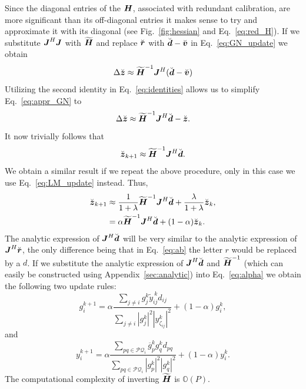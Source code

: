 \documentclass[useAMS,usenatbib]{mn2e}
\newcommand{\bz}{\bmath{z}}
\newcommand{\br}{\bmath{r}}
\newcommand{\bd}{\bmath{d}}
\newcommand{\bv}{\bmath{v}}
\newcommand{\bJ}{\bmath{J}}
\newcommand{\bH}{\bmath{H}}
\newcommand{\conj}[1]{\overline{#1}}
\begin{document}
Since the diagonal entries of the $\bH$, associated with redundant calibration, are more significant than its off-diagonal entries it makes 
sense to try and approximate it with its diagonal (see Fig.~\ref{fig:hessian} and Eq.~\eqref{eq:red_H}).
If we substitute $\bJ^H\bJ$ with $\widetilde{\bH}$ and replace $\breve{\br}$ with $\breve{\bd} - \breve{\bv}$ in Eq.~\eqref{eq:GN_update} we obtain
\begin{equation}
\label{eq:appr_GN}
 \Delta \breve{\bz} \approx \widetilde{\bH}^{-1}\bJ^H(\breve{\bd}-\breve{\bv})
\end{equation}
Utilizing the second identity in Eq.~\eqref{eq:identities} allows us to simplify Eq.~\eqref{eq:appr_GN} to
\begin{equation}
  \Delta \breve{\bz} \approx \widetilde{\bH}^{-1}\bJ^H\breve{\bd}-\breve{\bz}.
\end{equation}
It now trivially follows that
\begin{equation}
 \breve{\bz}_{k+1} \approx \widetilde{\bH}^{-1}\bJ^H\breve{\bd}.
\end{equation}
We obtain a similar result if we repeat the above procedure, only in this case we use Eq.~\eqref{eq:LM_update} instead. Thus,
\begin{align}
\breve{\bz}_{k+1} &\approx \frac{1}{1+\lambda}\widetilde{\bH}^{-1}\bJ^H\breve{\bd} + \frac{\lambda}{1+\lambda} \breve{\bz}_k,\label{eq:lambda}\\
 &= \alpha \widetilde{\bH}^{-1}\bJ^H\breve{\bd} + (1-\alpha)\breve{\bz}_k. \label{eq:alpha}  
\end{align}
The analytic expression of $\bJ^H\breve{\bd}$ will be very similar to the analytic 
expression of $\bJ^H\breve{\br}$, the only difference being that in Eq.~\eqref{eq:ab} the letter $r$ would be replaced by a $d$. If we substitute the analytic expression
of $\bJ^H\breve{\bd}$ and $\widetilde{\bH}^{-1}$ (which can easily be constructed using Appendix~\ref{sec:analytic}) into Eq.~\eqref{eq:alpha} we obtain the following two update rules:
\begin{equation}
\label{eq:g_update}
g_{i}^{k+1} = \alpha \frac{\sum_{j\neq i} g_j^k \widetilde{y}_{ij}^{~\!\!k} d_{ij}}{\sum_{j\neq i} |g_j^k|^2|y_{\zeta_{ij}}^k|^2} + (1-\alpha) g_i^k, 
\end{equation}
and
\begin{equation}
\label{eq:y_update}
y_{i}^{k+1} = \alpha \frac{\sum_{pq \in \mathcal{PQ}_i} \conj{g}_p^k g_q^k d_{pq}}{\sum_{pq \in \mathcal{PQ}_i}|g_p^k|^2|g_q^k|^2} + (1-\alpha) y_i^k. 
\end{equation}
The computational complexity of inverting $\widetilde{\bH}$ is $\mathbb{O}(P)$.
\end{document}
